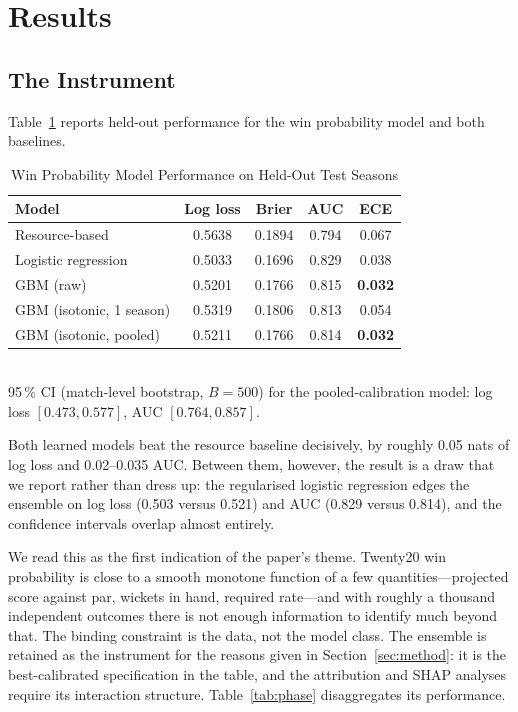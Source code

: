 \documentclass[conference]{IEEEtran}
\begin{document}
\section{Results}
\label{sec:results}

\subsection{The Instrument}
\label{sec:res-instrument}

Table~\ref{tab:wp} reports held-out performance for the win probability
model and both baselines.

\begin{table}[htbp]
\caption{Win Probability Model Performance on Held-Out Test Seasons}
\label{tab:wp}
\centering
\begin{tabular}{lcccc}
\toprule
\textbf{Model} & \textbf{Log loss} & \textbf{Brier} & \textbf{AUC} & \textbf{ECE} \\
\midrule
Resource-based \cite{dl1998} & 0.5638 & 0.1894 & 0.794 & 0.067 \\
Logistic regression          & 0.5033 & 0.1696 & 0.829 & 0.038 \\
GBM (raw)                    & 0.5201 & 0.1766 & 0.815 & \textbf{0.032} \\
GBM (isotonic, 1 season)     & 0.5319 & 0.1806 & 0.813 & 0.054 \\
GBM (isotonic, pooled)       & 0.5211 & 0.1766 & 0.814 & \textbf{0.032} \\
\bottomrule
\end{tabular}
\\[2pt]\footnotesize 95\,\% CI (match-level bootstrap, $B=500$) for the
pooled-calibration model: log loss $[0.473, 0.577]$, AUC $[0.764, 0.857]$.
\end{table}

Both learned models beat the resource baseline decisively, by roughly
0.05 nats of log loss and 0.02--0.035 AUC. Between them, however, the
result is a draw that we report rather than dress up: the regularised
logistic regression edges the ensemble on log loss (0.503 versus 0.521)
and AUC (0.829 versus 0.814), and the confidence intervals overlap
almost entirely.

We read this as the first indication of the paper's theme. Twenty20 win
probability is close to a smooth monotone function of a few
quantities---projected score against par, wickets in hand, required
rate---and with roughly a thousand independent outcomes there is not
enough information to identify much beyond that. The binding constraint
is the data, not the model class. The ensemble is retained as the
instrument for the reasons given in Section~\ref{sec:method}: it is the
best-calibrated specification in the table, and the attribution and SHAP
analyses require its interaction structure. Table~\ref{tab:phase}
disaggregates its performance.
\end{document}
